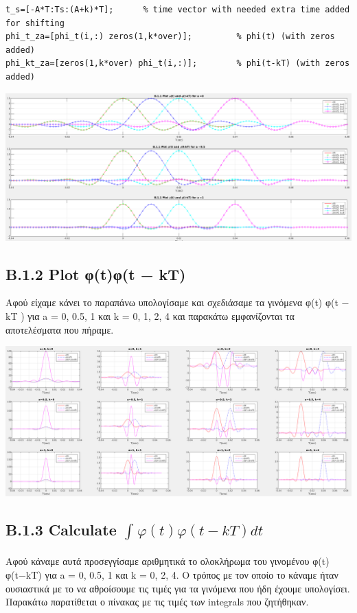 \documentclass[11pt]{article}
\begin{document}
     \begin{lstlisting}[caption = {Create signals}]
%Create signals
t_s=[-A*T:Ts:(A+k)*T];      % time vector with needed extra time added for shifting
phi_t_za=[phi_t(i,:) zeros(1,k*over)];         % phi(t) (with zeros added)
phi_kt_za=[zeros(1,k*over) phi_t(i,:)];        % phi(t-kT) (with zeros added)
    \end{lstlisting}
    
    \begin{center}
        \includegraphics[scale=0.22]{photos/B1.png}
    \end{center} 
    
    \subsection*{B.1.2 Plot φ(t)φ(t − kT)}
    Αφού είχαμε κάνει το παραπάνω υπολογίσαμε και σχεδιάσαμε τα γινόμενα φ(t) φ(t − kT ) για a = 0, 0.5, 1 και k = 0, 1, 2, 4 και παρακάτω εμφανίζονται τα αποτελέσματα που πήραμε.
    
    \begin{center}
        \includegraphics[scale=0.22]{photos/B2.png}
    \end{center} 
    
    
    \subsection*{B.1.3 Calculate $\int_{}^{} φ(t)φ(t − kT) dt$}
    Αφού κάναμε αυτά προσεγγίσαμε αριθμητικά το ολοκλήρωμα του γινομένου φ(t) φ(t−kT) για
    a = 0, 0.5, 1 και k = 0, 2, 4. Ο τρόπος με τον οποίο το κάναμε ήταν ουσιαστικά με το να αθροίσουμε τις τιμές για τα γινόμενα που ήδη έχουμε υπολογίσει. Παρακάτω παρατίθεται ο πίνακας με τις τιμές των integrals που ζητήθηκαν.
    
\end{document}
